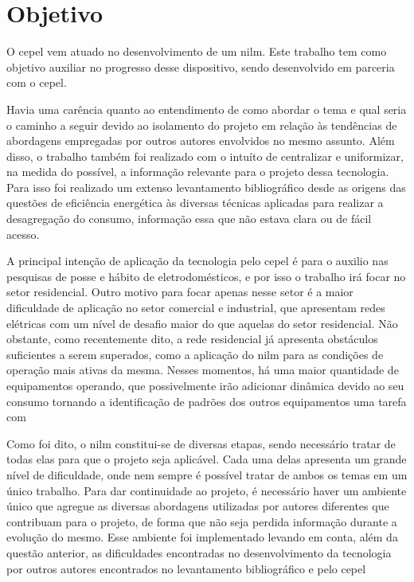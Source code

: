 \section{Objetivo}

O \acs{cepel} vem atuado no desenvolvimento de um \acs{nilm}. Este
trabalho tem como objetivo auxiliar no progresso desse dispositivo,
sendo desenvolvido em parceria com o \acs{cepel}.

Havia uma carência quanto ao entendimento de como abordar o tema e
qual seria o caminho a seguir devido ao isolamento do projeto em
relação às tendências de abordagens empregadas por outros autores
envolvidos no mesmo assunto. Além disso, o trabalho também foi
realizado com o intuíto de centralizar e uniformizar, na medida do
possível, a informação relevante para o projeto dessa tecnologia.
Para isso foi realizado um extenso levantamento bibliográfico desde as
origens das questões de eficiência energética às diversas técnicas
aplicadas para realizar a desagregação do consumo, informação essa que
não estava clara ou de fácil acesso.

A principal intenção de aplicação da tecnologia pelo \acs{cepel} é
para o auxilio nas pesquisas de posse e hábito de eletrodomésticos, e
por isso o trabalho irá focar no setor residencial. Outro motivo para
focar apenas nesse setor é a maior dificuldade de aplicação no setor
comercial e industrial, que apresentam redes elétricas com um nível de
desafio maior do que aquelas do setor residencial. Não obstante, como
recentemente dito, a rede residencial já apresenta obstáculos
suficientes a serem superados, como a aplicação do \acs{nilm} para as
condições de operação mais ativas da mesma. Nesses momentos, há uma
maior quantidade de equipamentos operando, que possivelmente irão
adicionar dinâmica devido ao seu consumo tornando a identificação de
padrões dos outros equipamentos uma tarefa com 

Como foi dito, o \acs{nilm} constitui-se de diversas etapas, sendo
necessário tratar de todas elas para que o projeto seja aplicável.
Cada uma delas apresenta um grande nível de dificuldade, onde nem
sempre é possível tratar de ambos os temas em um único trabalho.
Para dar continuidade ao projeto, é necessário haver um ambiente
único que agregue as diversas abordagens utilizadas por autores
diferentes que contribuam para o projeto, de forma que não
seja perdida informação durante a evolução do mesmo. Esse ambiente
foi implementado levando em conta, além da questão anterior, as
dificuldades encontradas no desenvolvimento da tecnologia por outros
autores encontrados no levantamento bibliográfico e pelo \acs{cepel}

